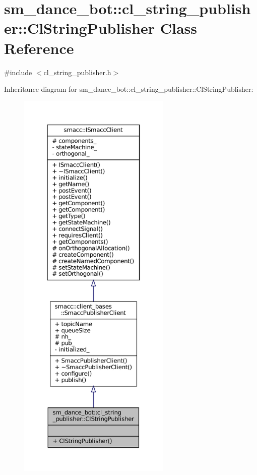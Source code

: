 \hypertarget{classsm__dance__bot_1_1cl__string__publisher_1_1ClStringPublisher}{}\section{sm\+\_\+dance\+\_\+bot\+:\+:cl\+\_\+string\+\_\+publisher\+:\+:Cl\+String\+Publisher Class Reference}
\label{classsm__dance__bot_1_1cl__string__publisher_1_1ClStringPublisher}


{\ttfamily \#include $<$cl\+\_\+string\+\_\+publisher.\+h$>$}



Inheritance diagram for sm\+\_\+dance\+\_\+bot\+:\+:cl\+\_\+string\+\_\+publisher\+:\+:Cl\+String\+Publisher\+:
\nopagebreak
\begin{figure}[H]
\begin{center}
\leavevmode
\includegraphics[height=550pt]{classsm__dance__bot_1_1cl__string__publisher_1_1ClStringPublisher__inherit__graph}
\end{center}
\end{figure}


